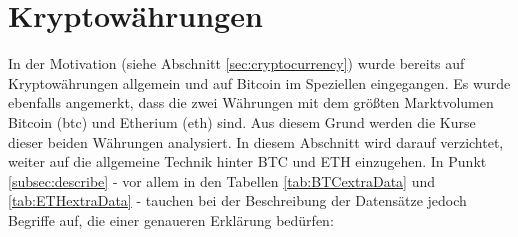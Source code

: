 \chapter{Kryptowährungen}\label{sec:cryptocurrency2}
In der Motivation (siehe Abschnitt \ref{sec:cryptocurrency}) wurde bereits auf Kryptowährungen allgemein und auf Bitcoin im Speziellen eingegangen. Es wurde ebenfalls angemerkt, dass die zwei Währungen mit dem größten Marktvolumen Bitcoin (\gls{btc}) und Etherium (\gls{eth}) sind. Aus diesem Grund werden die Kurse dieser beiden Währungen analysiert. In diesem Abschnitt wird darauf verzichtet, weiter auf die allgemeine Technik hinter BTC und ETH einzugehen. In Punkt \ref{subsec:describe} - vor allem in den Tabellen \ref{tab:BTCextraData} und \ref{tab:ETHextraData} - tauchen bei der Beschreibung der Datensätze jedoch Begriffe auf, die einer genaueren Erklärung bedürfen:
